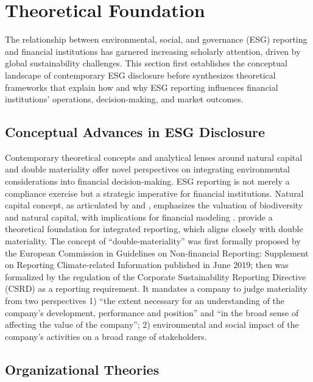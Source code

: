 \documentclass[
  authoryear]{elsarticle}
\begin{document}
\section{Theoretical Foundation}\label{theoretical-foundation}

The relationship between environmental, social, and governance (ESG)
reporting and financial institutions has garnered increasing scholarly
attention, driven by global sustainability challenges. This section
first establishes the conceptual landscape of contemporary ESG
disclosure before synthesizes theoretical frameworks that explain how
and why ESG reporting influences financial institutions' operations,
decision-making, and market outcomes.

\subsection{Conceptual Advances in ESG
Disclosure}\label{conceptual-advances-in-esg-disclosure}

Contemporary theoretical concepts and analytical lenses around natural
capital and double materiality offer novel perspectives on integrating
environmental considerations into financial decision-making. ESG
reporting is not merely a compliance exercise but a strategic imperative
for financial institutions. Natural capital concept, as articulated by
\citet{DASGUPTA2021} and \citet{DAILY2009}, emphasizes the valuation of
biodiversity and natural capital, with implications for financial
modeling \citep{ATKINSON2014}. \citet{ECCLES2014} provide a theoretical
foundation for integrated reporting, which aligns closely with double
materiality. The concept of ``double-materiality'' was first formally
proposed by the European Commission \citep{EC2019} in Guidelines on
Non-financial Reporting: Supplement on Reporting Climate-related
Information published in June 2019; then was formalized by the
regulation of the Corporate Sustainability Reporting Directive
(CSRD)\citep[see][]{EU_CSRD_2022} as a reporting requirement. It
mandates a company to judge materiality from two perspectives 1) ``the
extent necessary for an understanding of the company's development,
performance and position'' and ``in the broad sense of affecting the
value of the company''; 2) environmental and social impact of the
company's activities on a broad range of stakeholders.

\subsection{Organizational Theories}\label{organizational-theories}
\end{document}
